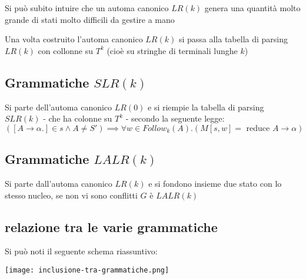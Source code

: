 Si può subito intuire che un automa canonico $LR(k)$ genera una quantità molto grande di stati molto difficili da gestire a mano

Una volta costruito l'automa canonico $LR(k)$ si passa alla tabella di parsing $LR(k)$ con collonne su $T^k$ (cioè su stringhe di terminali lunghe $k$)



\subsection{Grammatiche $SLR(k)$}

Si parte dell'automa canonico $LR(0)$ e si riempie la tabella di parsing $SLR(k)$ - che ha colonne su $T^k$ - secondo la seguente legge: 
\[
    ([A\to\alpha.]\in s\land A\neq S')\implies \forall w\in Follow_k(A).(M[s,w]=\text{ reduce } A\to\alpha)
\] 

\subsection{
    Grammatiche $LALR(k)$
}
Si parte dall'automa canonico $LR(k)$ e si fondono insieme due stato con lo stesso nucleo, se non vi sono conflitti $G$ è $LALR(k)$

\subsection{relazione tra le varie grammatiche}
Si può noti il seguente schema riassuntivo:
\begin{center}
    \texttt{[image: inclusione-tra-grammatiche.png]}
\end{center}

